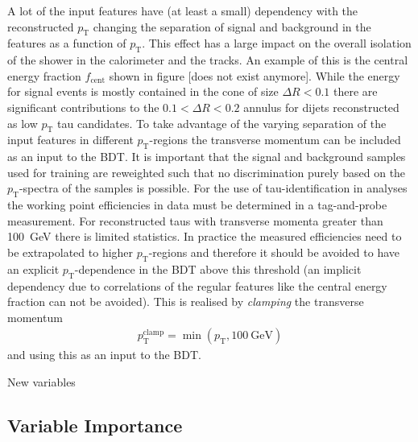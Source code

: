 A lot of the input features have (at least a small) dependency with the
reconstructed $p_\text{T}$ changing the separation of signal and background in
the features as a function of $p_\text{T}$. This effect has a large impact on
the overall isolation of the shower in the calorimeter and the tracks. An
example of this is the central energy fraction $f_\text{cent}$ shown in figure
[does not exist anymore]. While the energy for signal events is mostly contained
in the cone of size $\Delta R < 0.1$ there are significant contributions to the
$0.1 < \Delta R < 0.2$ annulus for dijets reconstructed as low $p_\text{T}$ tau
candidates. To take advantage of the varying separation of the input features in
different $p_\text{T}$-regions the transverse momentum can be included as an
input to the BDT. It is important that the signal and background samples used
for training are reweighted such that no discrimination purely based on the
$p_\text{T}$-spectra of the samples is possible. For the use of
tau-identification in analyses the working point efficiencies in data must be
determined in a tag-and-probe measurement. For reconstructed taus with
transverse momenta greater than \SI{100}{\giga\electronvolt} there is limited
statistics. In practice the measured efficiencies need to be extrapolated to
higher $p_\text{T}$-regions and therefore it should be avoided to have an
explicit $p_\text{T}$-dependence in the BDT above this threshold (an implicit
dependency due to correlations of the regular features like the central energy
fraction can not be avoided). This is realised by \emph{clamping} the transverse
momentum
\begin{align*}
  p_\text{T}^\text{clamp} = \min(p_\text{T}, \SI{100}{\giga\electronvolt})
\end{align*}
and using this as an input to the BDT.

\begin{table}[htb]
  \centering
  {\small}
  \caption{New variables}
  \label{tab:bdt_new_variables}
\end{table}

\subsection{Variable Importance}
\label{sec:bdt_var_importance}


